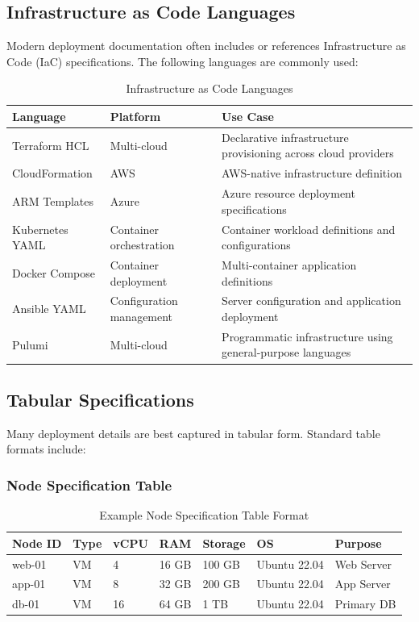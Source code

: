 \documentclass[11pt,letterpaper]{article}
\begin{document}
\subsection{Infrastructure as Code Languages}

Modern deployment documentation often includes or references Infrastructure as Code (IaC) specifications. The following languages are commonly used:

\begin{table}[H]
\centering
\caption{Infrastructure as Code Languages}
\small
\begin{tabular}{@{}L{2.5cm}L{3cm}L{8cm}@{}}
\toprule
\textbf{Language} & \textbf{Platform} & \textbf{Use Case} \\
\midrule
Terraform HCL & Multi-cloud & Declarative infrastructure provisioning across cloud providers \\
CloudFormation & AWS & AWS-native infrastructure definition \\
ARM Templates & Azure & Azure resource deployment specifications \\
Kubernetes YAML & Container orchestration & Container workload definitions and configurations \\
Docker Compose & Container deployment & Multi-container application definitions \\
Ansible YAML & Configuration management & Server configuration and application deployment \\
Pulumi & Multi-cloud & Programmatic infrastructure using general-purpose languages \\
\bottomrule
\end{tabular}
\end{table}

\subsection{Tabular Specifications}

Many deployment details are best captured in tabular form. Standard table formats include:

\subsubsection{Node Specification Table}

\begin{table}[H]
\centering
\caption{Example Node Specification Table Format}
\small
\begin{tabular}{@{}L{2cm}L{2cm}L{1.5cm}L{1.5cm}L{1.5cm}L{1.8cm}L{2cm}@{}}
\toprule
\textbf{Node ID} & \textbf{Type} & \textbf{vCPU} & \textbf{RAM} & \textbf{Storage} & \textbf{OS} & \textbf{Purpose} \\
\midrule
web-01 & VM & 4 & 16 GB & 100 GB & Ubuntu 22.04 & Web Server \\
app-01 & VM & 8 & 32 GB & 200 GB & Ubuntu 22.04 & App Server \\
db-01 & VM & 16 & 64 GB & 1 TB & Ubuntu 22.04 & Primary DB \\
\bottomrule
\end{tabular}
\end{table}
\end{document}
